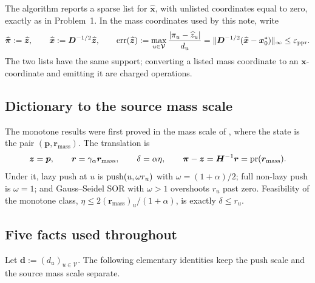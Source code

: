 The algorithm reports a sparse list for $\widehat{\bm{x}}$, with unlisted
coordinates equal to zero, exactly as in Problem~1. In the mass coordinates
used by this note, write
\begin{equation}
    \widehat{\bm{\pi}}:=\widehat{\bm{z}},
    \qquad
    \widehat{\bm{x}}:=\bm{D}^{-1/2}\widehat{\bm{z}},
    \qquad
    \operatorname{err}(\widehat{\bm{z}})
    :=\max_{u\in\mathcal{V}}
      \frac{\left\lvert \pi_{u}-\widehat z_{u} \right\rvert}{d_{u}}
    =\lVert\bm{D}^{-1/2}
      (\widehat{\bm{x}}-\bm{x}_0^*)\rVert_{\infty}
    \le\varepsilon_{\mathrm{ppr}} .
    \label{eq:ladder-guarantee}
\end{equation}
The two lists have the same support; converting a listed mass coordinate to
an $\bm{x}$-coordinate and emitting it are charged operations.

\subsection*{Dictionary to the source mass scale}

The monotone results were first proved in the mass scale of
, where the state is the \APPR{} pair
$(\bm{p},\bm{r}_{\mathrm{mass}})$. The translation is
\begin{equation}
    \bm{z}=\bm{p},
    \qquad
    \bm{r}=\gamma_{\alpha}\bm{r}_{\mathrm{mass}},
    \qquad
    \delta=\alpha\eta,
    \qquad
    \bm{\pi}-\bm{z}=\bm{H}^{-1}\bm{r}
    =\operatorname{pr}(\bm{r}_{\mathrm{mass}}).
    \label{eq:ladder-mass-dictionary}
\end{equation}
Under it, lazy \APPR{} push at $u$ is
$\operatorname{push}(u,\omega r_u)$ with $\omega=(1+\alpha)/2$; full non-lazy push is
$\omega=1$; and Gauss--Seidel SOR with $\omega>1$ overshoots $r_u$ past
zero. Feasibility of the monotone class,
$\eta\le2(\bm{r}_{\mathrm{mass}})_u/(1+\alpha)$, is exactly
$\delta\le r_u$.

\subsection*{Five facts used throughout}

Let $\bm{d}:=(d_u)_{u\in\mathcal{V}}$. The following elementary identities
keep the push scale and the source mass scale separate.

